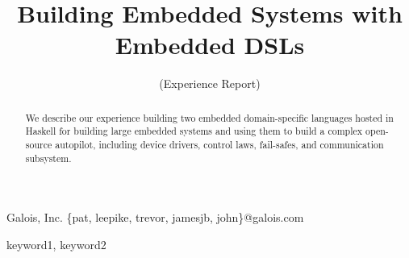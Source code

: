 \documentclass{sigplanconf}
\begin{document}
\setlength{\pdfpageheight}{\paperheight}
\setlength{\pdfpagewidth}{\paperwidth}






\title{Building Embedded Systems with Embedded DSLs}
\subtitle{(Experience Report)}

           {Galois, Inc.}
           {\{pat, leepike, trevor, jamesjb, john\}@galois.com}

\maketitle

\begin{abstract}
We describe our experience building two embedded domain-specific languages
hosted in Haskell for building large embedded systems and using them to build a
complex open-source autopilot, including device drivers, control laws, fail-safes,
and communication subsystem.
\end{abstract}



\keywords
keyword1, keyword2






\end{document}
